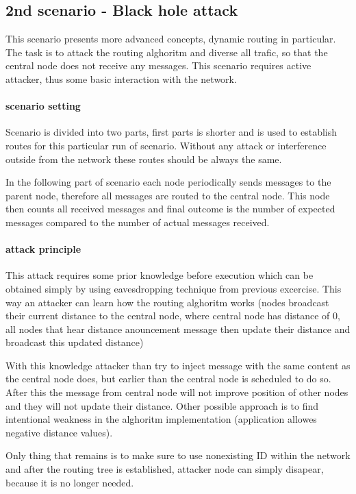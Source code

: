 \documentclass[
  digital, %
  table,   %
  nolof,     %
  nolot,     %
           oneside
]{fithesis3}
\begin{document}
    \subsection{2nd scenario - Black hole attack}
    This scenario presents more advanced concepts, dynamic routing in particular. The task is to attack the routing alghoritm and diverse all trafic, so that the central node does not receive any messages. This scenario requires active attacker, thus some basic interaction with the network.

    \paragraph{scenario setting}
    Scenario is divided into two parts, first parts is shorter and is used to establish routes for this particular run of scenario. Without any attack or interference outside from the network these routes should be always the same.

    In the following part of scenario each node periodically sends messages to the parent node, therefore all messages are routed to the central node. This node then counts all received messages and final outcome is the number of expected messages compared to the number of actual messages received.

    \paragraph{attack principle}
    This attack requires some prior knowledge before execution which can be obtained simply by using eavesdropping technique from previous excercise. This way an attacker can learn how the routing alghoritm works (nodes broadcast their current distance to the central node, where central node has distance of 0, all nodes that hear distance anouncement message then update their distance and broadcast this updated distance)

    With this knowledge attacker than try to inject message with the same content as the central node does, but earlier than the central node is scheduled to do so. After this the message from central node will not improve position of other nodes and they will not update their distance. Other possible approach is to find intentional weakness in the alghoritm implementation (application allowes negative distance values).

    Only thing that remains is to make sure to use nonexisting ID within the network and after the routing tree is established, attacker node can simply disapear, because it is no longer needed.
\end{document}
